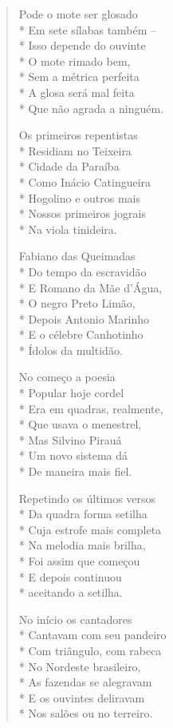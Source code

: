 \begin{verse}
Pode o mote ser glosado\\*
Em sete sílabas também --\\*
Isso depende do ouvinte\\*
O mote rimado bem,\\*
Sem a métrica perfeita\\*
A glosa será mal feita\\*
Que não agrada a ninguém.

Os primeiros repentistas\\*
Residiam no Teixeira\\*
Cidade da Paraíba\\*
Como Inácio Catingueira\\*
Hogolino e outros mais\\*
Nossos primeiros jograis\\*
Na viola tinideira.

Fabiano das Queimadas\\*
Do tempo da escravidão\\*
E Romano da Mãe d'Água,\\*
O negro Preto Limão,\\*
Depois Antonio Marinho\\*
E o célebre Canhotinho\\*
Ídolos da multidão.

No começo a poesia\\*
Popular hoje cordel\\*
Era em quadras, realmente,\\*
Que usava o menestrel,\\*
Mas Silvino Pirauá\\*
Um novo sistema dá\\*
De maneira mais fiel.

Repetindo os últimos versos\\*
Da quadra forma setilha\\*
Cuja estrofe mais completa\\*
Na melodia mais brilha,\\*
Foi assim que começou\\*
E depois continuou\\*
aceitando a setilha.

No início os cantadores\\*
Cantavam com seu pandeiro\\*
Com triângulo, com rabeca\\*
No Nordeste brasileiro,\\*
As fazendas se alegravam\\*
E os ouvintes deliravam\\*
Nos salões ou no terreiro.


\end{verse}
